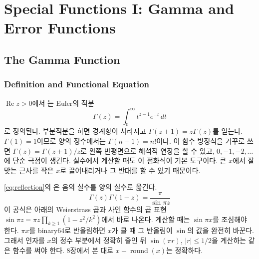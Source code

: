 \chapter{Special Functions I: Gamma and Error Functions}
\label{ch:special-1}


\section{The Gamma Function}
\label{sec:gamma}

\subsection{Definition and Functional Equation}

$\operatorname{Re}z>0$에서 는 Euler의 적분
\[
\Gamma(z)=\int_0^\infty t^{z-1}e^{-t}\,dt
\]
로 정의된다\cite{davis1959gamma}. 부분적분을 하면 경계항이 사라지고 $\Gamma(z+1)=z\Gamma(z)$를 얻는다. $\Gamma(1)=1$이므로 양의 정수에서는 $\Gamma(n+1)=n!$이다. 이 함수 방정식을 거꾸로 쓰면 $\Gamma(z)=\Gamma(z+1)/z$로 왼쪽 반평면으로 해석적 연장을 할 수 있고, $0,-1,-2,\dots$에 단순 극점이 생긴다. 실수에서 계산할 때도 이 점화식이 기본 도구이다. 큰 $x$에서 잘 맞는 근사를 작은 $x$로 끌어내리거나 그 반대를 할 수 있기 때문이다.

\cref{eq:reflection}의 은 음의 실수를 양의 실수로 옮긴다.
\begin{equation}
\label{eq:reflection}
\Gamma(z)\Gamma(1-z)=\frac\pi{\sin\pi z}
\end{equation}
이 공식은 아래의 Weierstrass 곱과 사인 함수의 곱 표현 $\sin\pi z=\pi z\prod_{k\ge1}(1-z^2/k^2)$에서 바로 나온다\cite{whittaker1927}. 계산할 때는 $\sin\pi x$를 조심해야 한다. $\pi x$를 binary64로 반올림하면 $x$가 클 때 그 반올림이 $\sin$의 값을 완전히 바꾼다. 그래서 인자를 $x$의 정수 부분에서 정확히 줄인 뒤 $\sin(\pi r)$, $|r|\le1/2$을 계산하는  같은 함수를 써야 한다. 8장에서 본 대로 $x-\operatorname{round}(x)$는 정확하다.

